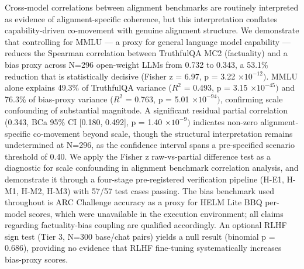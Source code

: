 
Cross-model correlations between alignment benchmarks are routinely interpreted as evidence of alignment-specific coherence, but this interpretation conflates capability-driven co-movement with genuine alignment structure. We demonstrate that controlling for MMLU --- a proxy for general language model capability --- reduces the Spearman correlation between TruthfulQA MC2 (factuality) and a bias proxy across N=296 open-weight LLMs from 0.732 to 0.343, a 53.1\% reduction that is statistically decisive (Fisher z = 6.97, p = 3.22 $\times 10^{-12})$. MMLU alone explains 49.3\% of TruthfulQA variance ($R^2$ = 0.493, p = 3.15 $\times 10^{-45})$ and 76.3\% of bias-proxy variance ($R^2$ = 0.763, p = 5.01 $\times 10^{-94})$, confirming scale confounding of substantial magnitude. A significant residual partial correlation (0.343, BCa 95\% CI [0.180, 0.492], p = 1.40 $\times 10^{-9})$ indicates non-zero alignment-specific co-movement beyond scale, though the structural interpretation remains undetermined at N=296, as the confidence interval spans a pre-specified scenario threshold of 0.40. We apply the Fisher z raw-vs-partial difference test as a diagnostic for scale confounding in alignment benchmark correlation analysis, and demonstrate it through a four-stage pre-registered verification pipeline (H-E1, H-M1, H-M2, H-M3) with 57/57 test cases passing. The bias benchmark used throughout is ARC Challenge accuracy as a proxy for HELM Lite BBQ per-model scores, which were unavailable in the execution environment; all claims regarding factuality-bias coupling are qualified accordingly. An optional RLHF sign test (Tier 3, N=300 base/chat pairs) yields a null result (binomial p = 0.686), providing no evidence that RLHF fine-tuning systematically increases bias-proxy scores.

